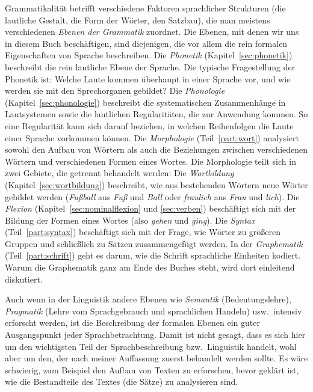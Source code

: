 Grammatikalität betrifft verschiedene Faktoren sprachlicher Strukturen (\zB die lautliche Gestalt, die Form der Wörter, den Satzbau), die man meistens verschiedenen \textit{Ebenen der Grammatik} zuordnet.
Die Ebenen, mit denen wir uns in diesem Buch beschäftigen, sind diejenigen, die vor allem die rein formalen Eigenschaften von Sprache beschreiben.
Die \textit{Phonetik} (Kapitel~\ref{sec:phonetik}) beschreibt die rein lautliche Ebene der Sprache.
Die typische Fragestellung der Phonetik ist:
Welche Laute kommen überhaupt in einer Sprache vor, und wie werden sie mit den Sprechorganen gebildet?
Die \textit{Phonologie} (Kapitel~\ref{sec:phonologie}) beschreibt die systematischen Zusammenhänge in Lautsystemen sowie die lautlichen Regularitäten, die zur Anwendung kommen.
So eine Regularität kann sich \zB darauf beziehen, in welchen Reihenfolgen die Laute einer Sprache vorkommen können.
Die \textit{Morphologie} (Teil~\ref{part:wort}) analysiert sowohl den Aufbau von Wörtern als auch die Beziehungen zwischen verschiedenen Wörtern und verschiedenen Formen eines Wortes.
Die Morphologie teilt sich in zwei Gebiete, die getrennt behandelt werden:
Die \textit{Wortbildung} (Kapitel~\ref{sec:wortbildung}) beschreibt, wie aus bestehenden Wörtern neue Wörter gebildet werden (\zB \textit{Fußball} aus \textit{Fuß} und \textit{Ball} oder \textit{fraulich} aus \textit{Frau} und \textit{lich}).
Die \textit{Flexion} (Kapitel~\ref{sec:nominalflexion} und \ref{sec:verben}) beschäftigt sich mit der Bildung der Formen eines Wortes (also \zB \textit{gehen} und \textit{ging}). 
Die \textit{Syntax} (Teil~\ref{part:syntax}) beschäftigt sich mit der Frage, wie Wörter zu größeren Gruppen und schließlich zu Sätzen zusammengefügt werden.
In der \textit{Graphematik} (Teil~\ref{part:schrift}) geht es darum, wie die Schrift sprachliche Einheiten kodiert.
Warum die Graphematik ganz am Ende des Buches steht, wird dort einleitend diskutiert.

Auch wenn in der Linguistik andere Ebenen wie \textit{Semantik} (Bedeutungslehre), \textit{Pragmatik} (Lehre vom Sprachgebrauch und sprachlichen Handeln) usw.\ intensiv erforscht werden, ist die Beschreibung der formalen Ebenen ein guter Ausgangspunkt jeder Sprachbetrachtung.
Damit ist nicht gesagt, dass es sich hier um den wichtigsten Teil der Sprachbeschreibung bzw.\ Linguistik handelt, wohl aber um den, der nach meiner Auffassung zuerst behandelt werden sollte.
Es wäre schwierig, zum Beispiel den Aufbau von Texten zu erforschen, bevor geklärt ist, wie die Bestandteile des Textes (die Sätze) zu analysieren sind.

